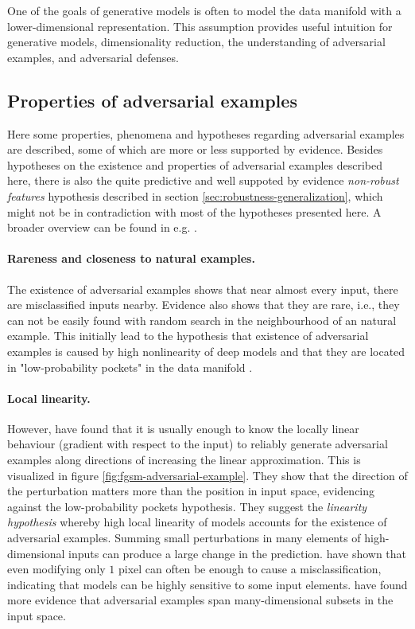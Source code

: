 \documentclass{article}
\begin{document}
One of the goals of generative models is often to model the data manifold with a lower-dimensional representation. This assumption provides useful intuition for generative models, dimensionality reduction, the understanding of adversarial examples, and adversarial defenses.


\subsection{Properties of adversarial examples}

Here some properties, phenomena and hypotheses regarding adversarial examples are described, some of which are more or less supported by evidence. Besides hypotheses on the existence and properties of adversarial examples described here, there is also the quite predictive and well suppoted by evidence \textit{non-robust features} hypothesis described in section \ref{sec:robustness-generalization}, which might not be in contradiction with most of the hypotheses presented here. A broader overview can be found in e.g. \citet{Serban:2018:AECCP}.

\paragraph{Rareness and closeness to natural examples.} The existence of adversarial examples shows that near almost every input, there are misclassified inputs nearby. Evidence also shows that they are rare, i.e., they can not be easily found with random search in the neighbourhood of an natural example. This initially lead to the hypothesis that existence of adversarial examples is caused by high nonlinearity of deep models and that they are located in "low-probability pockets" in the data manifold \citep{Szegedy:2013:IPNN}. 

\paragraph{Local linearity.} However, \citet{Goodfellow:2014:EHAE} have found that it is usually enough to know the locally linear behaviour (gradient with respect to the input) to reliably generate adversarial examples along directions of increasing the linear approximation. This is visualized in figure \ref{fig:fgsm-adversarial-example}. They show that the direction of the perturbation matters more than the position in input space, evidencing against the low-probability pockets hypothesis. They suggest the \textit{linearity hypothesis} whereby high local linearity of models accounts for the existence of adversarial examples. Summing small perturbations in many elements of high-dimensional inputs can produce a large change in the prediction. \citet{Su:2017:OPAFDNN} have shown that even modifying only $1$ pixel can often be enough to cause a misclassification, indicating that models can be highly sensitive to some input elements. \citet{Tabacof:2016:ESAI} have found more evidence that adversarial examples span many-dimensional subsets in the input space.
\end{document}
